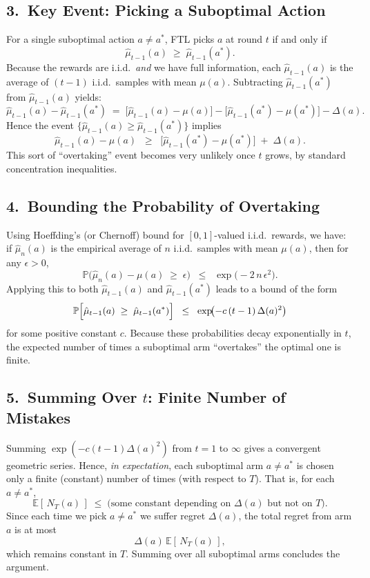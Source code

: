 \subsection*{3.\ Key Event: Picking a Suboptimal Action}

For a single suboptimal action $a \neq a^*$, FTL picks $a$ at round $t$ if and only if
\[
  \hat{\mu}_{t-1}(a)
  \;\ge\;
  \hat{\mu}_{t-1}(a^*).
\]
Because the rewards are i.i.d.\ \emph{and} we have full information, each $\hat{\mu}_{t-1}(a)$ is the average of $(t-1)$ i.i.d.\ samples with mean $\mu(a)$.  Subtracting $\hat{\mu}_{t-1}(a^*)$ from $\hat{\mu}_{t-1}(a)$ yields:
\[
  \hat{\mu}_{t-1}(a) - \hat{\mu}_{t-1}(a^*)
  \;=\;
  \bigl[\hat{\mu}_{t-1}(a) - \mu(a)\bigr]
  -
  \bigl[\hat{\mu}_{t-1}(a^*) - \mu(a^*)\bigr]
  -
  \Delta(a).
\]
Hence the event $\{\hat{\mu}_{t-1}(a) \ge \hat{\mu}_{t-1}(a^*)\}$ implies
\[
  \hat{\mu}_{t-1}(a) - \mu(a)
  \;\;\ge\;\;
  \bigl[\hat{\mu}_{t-1}(a^*) - \mu(a^*)\bigr]
  \;+\;
  \Delta(a).
\]
This sort of ``overtaking'' event becomes very unlikely once $t$ grows, by standard concentration inequalities.

\subsection*{4.\ Bounding the Probability of Overtaking}

Using Hoeffding's (or Chernoff) bound for $[0,1]$-valued i.i.d.\ rewards, we have: if $\hat{\mu}_n(a)$ is the empirical average of $n$ i.i.d.\ samples with mean $\mu(a)$, then for any $\epsilon > 0$,
\[
  \mathbb{P}\bigl(\hat{\mu}_n(a) - \mu(a) \;\ge\; \epsilon\bigr)
  \;\;\le\;\;
  \exp\bigl(-2\,n\,\epsilon^2\bigr).
\]
Applying this to both $\hat{\mu}_{t-1}(a)$ and $\hat{\mu}_{t-1}(a^*)$ leads to a bound of the form
\[
  \mathbb{P}\Bigl[\hat{\mu}_{t-1}(a) \;\ge\; \hat{\mu}_{t-1}(a^*)\Bigr]
  \;\;\le\;\;
  \exp\!\bigl(-c \,(t-1)\,\Delta(a)^2\bigr)
\]
for some positive constant $c$.  Because these probabilities decay exponentially in $t$, the expected number of times a suboptimal arm ``overtakes'' the optimal one is finite.

\subsection*{5.\ Summing Over $t$: Finite Number of Mistakes}

Summing $\exp(-c(t-1)\Delta(a)^2)$ from $t=1$ to $\infty$ gives a convergent geometric series.  Hence, \emph{in expectation}, each suboptimal arm $a \ne a^*$ is chosen only a finite (constant) number of times (with respect to $T$).  That is, for each $a \ne a^*$,
\[
  \mathbb{E}[\,N_T(a)\,]
  \;\le\;
  \text{(some constant depending on $\Delta(a)$ but not on $T$)}.
\]
Since each time we pick $a\neq a^*$ we suffer regret $\Delta(a)$, the total regret from arm $a$ is at most
\[
  \Delta(a)\,\mathbb{E}[\,N_T(a)\,],
\]
which remains constant in $T$.  Summing over all suboptimal arms concludes the argument.

